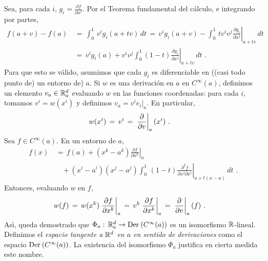 Sea, para cada $i$, $g_{i}=\frac{\partial f}{\partial x^{i}}$. Por el
Teorema fundamental del c\'{a}lculo, e integrando por partes,
\begin{align*}
	f(a+v)-f(a) & \,=\,\int_{0}^{1}\,v^{i}g_{i}(a+tv)\,dt \,=\,
		v^{i}g_{i}(a+v) -\int_{0}^{1}\,tv^{i}v^{j}
		\left.\frac{\partial g_{i}}{\partial x^{j}}\right|_{a+tv}\,dt\\
	& \,=\,v^{i}g_{i}(a) +v^{i}v^{j}\int_{0}^{1}(1-t)
		\left.\frac{\partial g_{i}}{\partial x^{j}}\right|_{a+tv}\,dt
	\text{ .}
\end{align*}
%
Para que esto se v\'{a}lido, asumimos que cada $g_{i}$ es diferenciable
en ((casi todo punto de) un entorno de) $a$. Si $w$ es una derivaci\'{o}n
en $a$ en $C^{\infty}(a)$, definimos un elemento $v_{a}\in\mathbb{R}^{d}_{a}$
evaluando $w$ en las funciones coordenadas: para cada $i$, tomamos
$v^{i}=w(x^{i})$ y definimos $v_{a}=v^{i}e_{i}|_{a}$. En particular,
\begin{align*}
	w(x^{i}) & \,=\,v^{i} \,=\,\left.\gancho{v}\right|_{a}(x^{i})
	\text{ .}
\end{align*}
%
Sea $f\in C^{\infty}(a)$. En un entorno de $a$,
\begin{equation}
	\label{eq:taylorordendos}
	\begin{aligned}
		f(x) & \,=\, f(a) + (x^{k}-a^{k})
			\left.\frac{\partial f}{\partial x^{k}}\right|_{a} \\
		& \quad + (x^{i}-a^{i})(x^{j}-a^{j})\int_{0}^{1}\,(1-t)\left.
			\frac{\partial^{2}f}{\partial x^{j}\partial x^{i}}
			\right|_{a+t(x-a)}\,dt
	\text{ .}
	\end{aligned}
\end{equation}
%
Entonces, evaluando $w$ en $f$,
\begin{align*}
	w(f) & \,=\,w(x^{k})\left.\frac{\partial f}{\partial x^{k}}\right|_{a}
		\,=\,v^{k}\left.\frac{\partial f}{\partial x^{k}}\right|_{a}
		\,=\,\left.\gancho{v}\right|_{a}(f)
	\text{ .}
\end{align*}
%
As\'{\i}, queda demostrado que $\Phi_{a}:\,\bb{R}^{d}_{a}\rightarrow%
\derivaciones{C^{\infty}(a)}$ es un isomorfismo $\mathbb{R}$-lineal. Definimos
el \emph{espacio tangente a $\mathbb{R}^{d}$ en $a$ en sentido de derivaciones}
como el espacio $\mathrm{Der}_{}\left(C^{\infty}(a)\right)$. La existencia del
isomorfismo $\Phi_{a}$ justifica en cierta medida este nombre.

